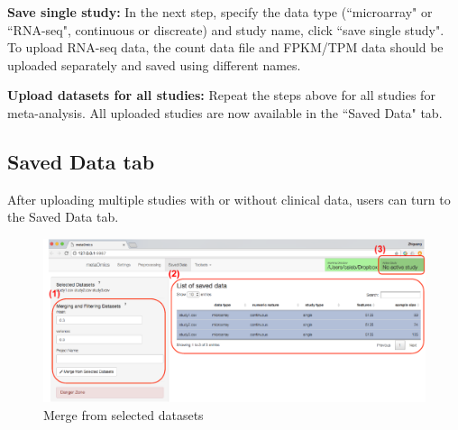 \begin{steps}
\item \textbf{Save single study:}
In the next step,
specify the data type (``microarray" or ``RNA-seq", continuous or discreate) and study name,
click ``save single study".
To upload RNA-seq data, the count data file and FPKM/TPM
 data should be uploaded separately and saved using different names.

\item \textbf{Upload datasets for all studies:}
Repeat the steps above for all studies for meta-analysis.
All uploaded studies are now available in the ``Saved Data" tab. 
 
\end{steps}

\subsection{Saved Data tab}
\label{sec:saved}

After uploading multiple studies with or without clinical data,
users can turn to the Saved Data tab.

\begin{figure}[H]
\begin{center}
\includegraphics[scale=0.9]{./figure/preprocessing/GUImerge.pdf}
\caption{Merge from selected datasets}
\label{fig:GUImerge}
\end{center}
\end{figure}


